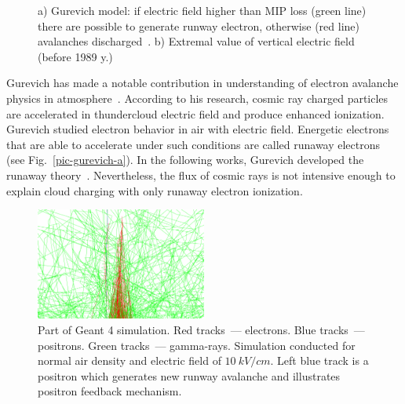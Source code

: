 \documentclass[utf8]{webofc}
\begin{document}
\begin{figure}[ht!]
\begin{subfigure}[b]{0.5\textwidth}
            \caption{}
            \label{pic-field-b}
        \end{subfigure}
        \caption{
            a) Gurevich model: if electric field higher than MIP loss (green line) there are possible to generate runway electron, otherwise (red line) avalanches discharged~\cite{gurevich1992runaway}.
            b) Extremal value of vertical electric field (before 1989 y.)~\cite{mazin1989clouds}}
    \end{figure}
    
    Gurevich has made a notable contribution in understanding of electron avalanche physics in atmosphere~\cite{gurevich1992runaway}. According to his research, cosmic ray charged particles are accelerated in thundercloud electric field and produce enhanced ionization. Gurevich studied electron behavior in air with electric field. Energetic electrons that are able to accelerate under such conditions are called runaway electrons (see Fig.~\ref{pic-gurevich-a}). In the following works, Gurevich developed the runaway theory~\cite{gurevich1999lightning,gurevich2001kinetic}. Nevertheless, the flux of cosmic rays is not intensive enough to explain cloud charging with only runaway electron ionization.
    \begin{figure}[t]
        \centering
        \includegraphics[width=0.5\textwidth]{pictures/10_dwyer}
        
        
        
        \caption{Part of Geant 4 simulation. Red tracks~--- electrons. Blue tracks~--- positrons. Green tracks~--- gamma-rays. Simulation conducted for normal air density and electric field of $10~kV/cm$. Left blue track is a positron which generates new runway avalanche and illustrates positron feedback mechanism.}
        \label{pic-dwyer-a}   
    \end{figure}
    
\end{document}
